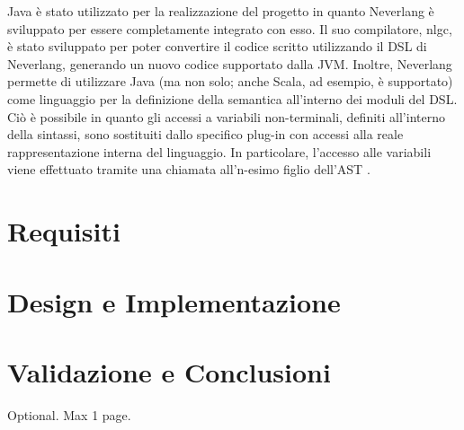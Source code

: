 \documentclass[12pt,a4paper,openright,twoside]{book}
\begin{document}
Java è stato utilizzato per la realizzazione del progetto in quanto Neverlang è sviluppato per essere completamente integrato con esso.
Il suo compilatore, nlgc, è stato sviluppato per poter convertire il codice scritto utilizzando il DSL di Neverlang, generando un nuovo codice
supportato dalla \ac{JVM}. Inoltre, Neverlang permette di utilizzare Java (ma non solo; anche Scala, ad esempio, è supportato) come linguaggio 
per la definizione della semantica all'interno dei moduli del \ac{DSL}. Ciò è possibile in quanto gli accessi a variabili non-terminali, 
definiti all'interno della sintassi, sono sostituiti dallo specifico plug-in con accessi alla reale rappresentazione interna del linguaggio. 
In particolare, l'accesso alle variabili viene effettuato tramite una chiamata all'n-esimo figlio dell'\ac{AST} \cite{Cazzola2013}.

\chapter{Requisiti}
\label{chap:requisiti}


\chapter{Design e Implementazione}
\label{chap:Imple}


\chapter{Validazione e Conclusioni}
\label{chap:conclusioni}



\backmatter

\nocite{*} %




\begin{acknowledgements} %
Optional. Max 1 page.
\end{acknowledgements}
\end{document}
